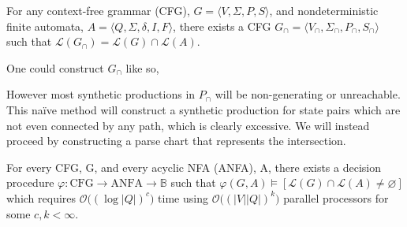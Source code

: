 \documentclass[sigplan,review,acmsmall,nonacm,screen,anonymous]{acmart}\settopmatter{printfolios=false,printccs=false,printacmref=false}
\begin{document}
  \begin{theorem}
    For any context-free grammar (CFG), $G = \langle V, \Sigma, P, S\rangle$, and nondeterministic finite automata, $A = \langle Q, \Sigma, \delta, I, F\rangle$, there exists a CFG \(G_\cap=\langle V_\cap, \Sigma_\cap, P_\cap, S_\cap\rangle\) such that $\mathcal{L}(G_\cap) = \mathcal{L}(G)\cap\mathcal{L}(A)$.
  \end{theorem}

  \begin{definition}[Salomaa, 1973]
    One could construct $G_\cap$ like so,

    \noindent{}
  \end{definition}

  However most synthetic productions in $P_\cap$ will be non-generating or unreachable. This na\"ive method will construct a synthetic production for state pairs which are not even connected by any path, which is clearly excessive. We will instead proceed by constructing a parse chart that represents the intersection.

  \begin{theorem}%
    For every CFG, G, and every acyclic NFA (ANFA), A, there exists a decision procedure $\varphi: \text{CFG} \rightarrow \text{ANFA} \rightarrow \mathbb{B}$ such that $\varphi(G, A) \models [\mathcal{L}(G)\cap\mathcal{L}(A) \neq \varnothing]$ which requires $\mathcal{O}\big((\log |Q|)^c\big)$ time using $\mathcal{O}\big((|V||Q|)^k\big)$ parallel processors for some $c, k < \infty$.
  \end{theorem}
\end{document}
